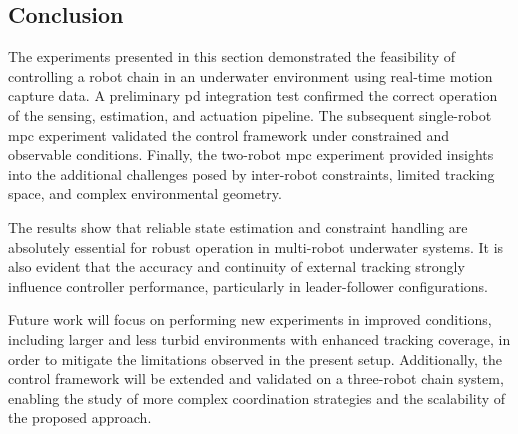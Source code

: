 \subsection{Conclusion}
\label{e_rcce_conclusion}

The experiments presented in this section demonstrated the feasibility of controlling a robot chain
in an underwater environment using real-time motion capture data. A preliminary \ac{pd} integration
test confirmed the correct operation of the sensing, estimation, and actuation pipeline. The
subsequent single-robot \ac{mpc} experiment validated the control framework under constrained and
observable conditions. Finally, the two-robot \ac{mpc} experiment provided insights into the
additional challenges posed by inter-robot constraints, limited tracking space, and complex
environmental geometry.

The results show that reliable state estimation and constraint handling are absolutely essential
for robust operation in multi-robot underwater systems. It is also evident that the accuracy and
continuity of external tracking strongly influence controller performance, particularly in
leader-follower configurations.

Future work will focus on performing new experiments in improved conditions, including larger and
less turbid environments with enhanced tracking coverage, in order to mitigate the limitations
observed in the present setup. Additionally, the control framework will be extended and validated
on a three-robot chain system, enabling the study of more complex coordination strategies and the
scalability of the proposed approach.
